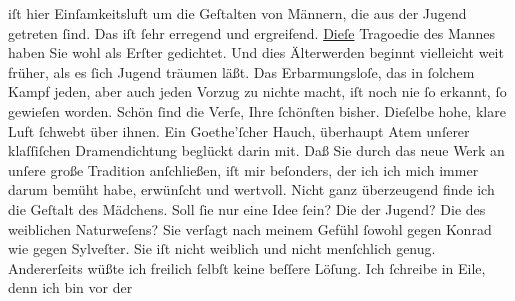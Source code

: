 \begin{ledgroupsized}[t]{13cm}
                    iſt hier Einſamkeitsluft um die Geſtalten von Männern, die aus der Jugend
                    getreten ſind. Das iſt ſehr erregend und ergreifend. \uline{Dieſe} Tragoedie des Mannes haben Sie wohl als Erſter gedichtet. Und
                    dies Älterwerden beginnt vielleicht weit früher, als es ſich Jugend träumen
                    läßt. Das Erbarmungsloſe, das in ſolchem Kampf jeden, aber auch jeden Vorzug zu
                    nichte macht, iſt noch nie ſo erkannt, ſo gewieſen worden.\pend
           \pstart
           Schön ſind die Verſe, Ihre ſchönſten bisher. Dieſelbe hohe, klare Luft ſchwebt
                    über ihnen. Ein Goethe’ſcher Hauch,
                    überhaupt Atem unſerer klaſſiſchen Dramendichtung {\pb}beglückt darin mit. Daß Sie durch das neue Werk an unſere große Tradition anſchließen, iſt mir
                    beſonders, der ich ich mich immer darum bemüht habe, erwünſcht und wertvoll.\pend
           \pstart
           Nicht ganz überzeugend finde ich die Geſtalt des Mädchens. Soll ſie nur eine Idee ſein? Die der
                    Jugend? Die des weiblichen Naturweſens? Sie verſagt nach meinem Gefühl ſowohl
                    gegen Konrad wie gegen Sylveſter. Sie iſt nicht
                    weiblich und nicht menſchlich genug. Andererſeits wüßte ich freilich ſelbſt
                    keine beſſere Löſung.\pend
           \pstart
           Ich ſchreibe in Eile, denn ich bin vor der \label{K_L02468_1v}
\end{ledgroupsized}
